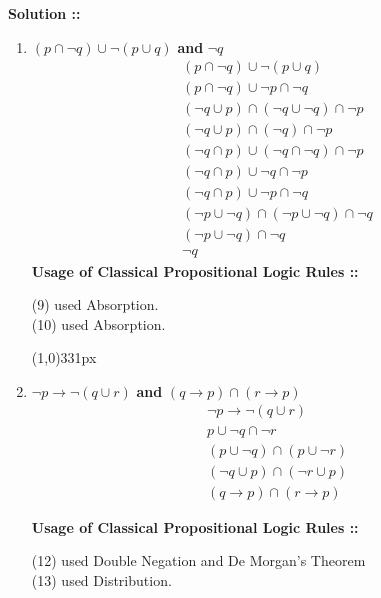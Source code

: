 \documentclass[11pt]{article}
\begin{document}
\vspace{5px}\textbf{Solution ::}
\begin{enumerate}[label=4.\arabic* ::]
\item 
$(p\cap\neg q)\cup\neg (p\cup q)$ \textbf{and} $\neg q$
\begin{align}
    &(p\cap\neg q)\cup\neg (p\cup q) \\
    &(p\cap\neg q)\cup\neg p\cap\neg q \\
    &(\neg q\cup p)\cap (\neg q\cup\neg q)\cap\neg p \\
    &(\neg q\cup p)\cap (\neg q)\cap\neg p \\
    &(\neg q\cap p)\cup (\neg q\cap\neg q)\cap\neg p \\
    &(\neg q\cap p)\cup\neg q\cap\neg p \\
    &(\neg q\cap p)\cup\neg p\cap\neg q \\
    &(\neg p\cup\neg q)\cap (\neg p\cup\neg q)\cap\neg q \\
    &(\neg p\cup\neg q)\cap\neg q \\
    &\neg q
\end{align}
\textbf{Usage of Classical Propositional Logic Rules ::}

(9) \hspace{5px}used Absorption. \\
(10) used Absorption.

\line(1,0){331px}
\item
$\neg p\rightarrow\neg (q\cup r)$ \textbf{and} $(q\rightarrow p)\cap(r\rightarrow p)$
\begin{align}
    &\neg p\rightarrow\neg (q\cup r) \\
    &p\cup\neg q\cap\neg r \\
    &(p\cup\neg q)\cap (p\cup\neg r) \\
    &(\neg q\cup p)\cap (\neg r\cup p) \\
    &(q\rightarrow p)\cap (r\rightarrow p)
\end{align}

\textbf{Usage of Classical Propositional Logic Rules ::}

(12) used Double Negation and De Morgan's Theorem \\
(13) used Distribution.
\pagebreak


\end{enumerate}
\end{document}
